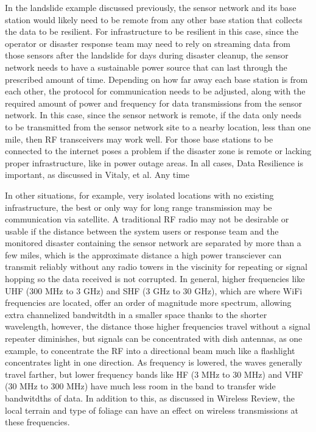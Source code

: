 \documentclass[conference]{IEEEtran}
\begin{document}
In the landslide example discussed previously, the sensor network and its base station would likely 
need to be remote from any other base station that collects the data to be resilient. 
For infrastructure to be resilient in this case, since the operator or disaster response team may need 
to rely on streaming data from those sensors after the landslide
for days during disaster cleanup, the sensor network needs to have a sustainable power source that can last
through the prescribed amount of time. Depending on how far away 
each base station is from each other, the protocol for communication needs to be adjusted, along with the
required amount of power and frequency for data transmissions from the sensor network. 
In this case, since the sensor network is remote, if the data only needs to be transmitted 
from the sensor network site to a nearby location, less than one mile, then RF transceivers 
may work well. For those base stations to be connected to the internet poses a problem if the disaster 
zone is remote or lacking proper infrastructure, like in power outage areas. In all cases, Data Resilience
is important, as discussed in Vitaly, et al. \cite{jm1} Any time  \par

In other situations, for example, very isolated locations with no existing 
infrastructure, the best or only way for long range transmission may be communication via satellite. 
A traditional RF radio may not be desirable or usable if the distance between the system users or 
response team and the monitored disaster containing the sensor network are separated by more 
than a few miles, which is the approximate distance a high power transciever 
can transmit reliably without any radio towers in the viscinity for repeating or signal hopping so the 
data received is not corrupted. In general, higher frequencies like UHF (300 MHz to 3 GHz) and 
SHF (3 GHz to 30 GHz), which are where WiFi frequencies are located, offer an order of magnitude 
more spectrum, allowing extra channelized bandwitdth in a smaller space thanks to the shorter 
wavelength, however, the distance those higher frequencies travel without a signal repeater 
diminishes, but signals can be concentrated with dish antennas, as one example, to concentrate 
the RF into a directional beam much like a flashlight concentrates light in one direction. 
As frequency is lowered, the waves generally travel farther, but lower frequency bands 
like HF (3 MHz to 30 MHz) and VHF (30 MHz to 300 MHz) have much less room in the band to 
transfer wide bandwitdths of data. In addition to this, as discussed in Wireless Review, \cite{jm6}
the local terrain and type of foliage can have an effect on wireless transmissions at these
frequencies. \par
\end{document}

